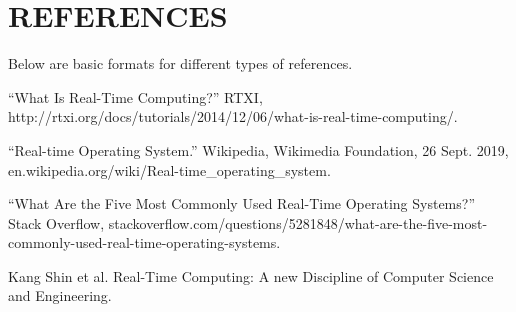 \documentclass[letterpaper, 10 pt, conference]{IEEEconf}
\begin{document}
\section*{REFERENCES}

Below are basic formats for different types of references.

\begin{enumerate}[label={[\arabic*]}]
  \item “What Is Real-Time Computing?” RTXI, http://rtxi.org/docs/tutorials/2014/12/06/what-is-real-time-computing/.
  \item ``Real-time Operating System.'' Wikipedia, Wikimedia Foundation, 26 Sept. 2019, \\ en.wikipedia.org/wiki/Real-time\_operating\_system.
  \item “What Are the Five Most Commonly Used Real-Time Operating Systems?” Stack Overflow, stackoverflow.com/questions/5281848/what-are-the-five-most-commonly-used-real-time-operating-systems. 
  \item Kang Shin et al. Real-Time Computing: A new Discipline of Computer Science and Engineering.
\end{enumerate}
\end{document}

